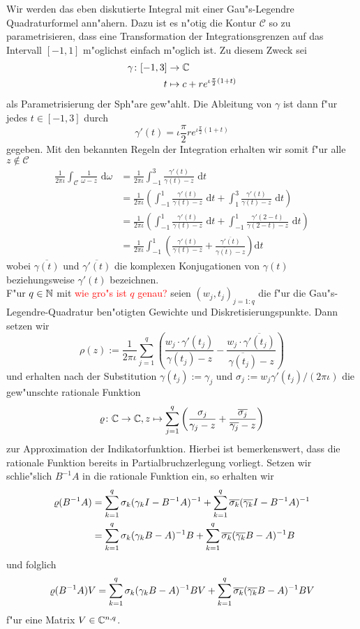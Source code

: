 Wir werden das eben diskutierte Integral mit einer Gau"s-Legendre Quadraturformel ann"ahern.
Dazu ist es n"otig die Kontur $\mathcal{C}$ so zu parametrisieren, dass eine Transformation
der Integrationsgrenzen auf das Intervall $[-1,1]$ m"oglichst einfach m"oglich ist. Zu diesem Zweck sei
\begin{align*}
\gamma\colon[-1,3]&\to\mathbb{C} \\
t&\mapsto c+re^{\iota \frac{\pi}{2}(1+t)}
\end{align*}
als Parametrisierung der Sph"are gew"ahlt. Die
Ableitung von $\gamma$ ist dann f"ur jedes $t\in[-1,3]$ durch
\[
\gamma'(t)=\iota \frac{\pi}{2}re^{\iota \frac{\pi}{2}(1+t)}
\]
gegeben. Mit den bekannten Regeln der Integration erhalten wir somit f"ur alle $z\notin\mathcal{C}$
\begin{align*}
\frac{1}{2\pi\iota}\int_{ \mathcal{C}}\frac{1}{\omega-z}\text{ d}\omega
&= \frac{1}{2\pi\iota} \int_{-1}^3 \frac{\gamma'(t)}{\gamma(t)-z}\text{ d}t \\
&= \frac{1}{2\pi\iota} \left( \int_{-1}^1 \frac{\gamma'(t)}{\gamma(t)-z} \text{ d}t +
\int_{1}^3\frac{\gamma'(t)}{\gamma(t)-z}\text{ d}t \right) \\
&= \frac{1}{2\pi\iota} \left( \int_{-1}^1 \frac{\gamma'(t)}{\gamma(t)-z} \text{ d}t +
\int_{-1}^1\frac{\gamma'(2-t)}{\gamma(2-t)-z}\text{ d}t \right) \\
&= \frac{1}{2\pi\iota} \int_{-1}^1 \left( \frac{\gamma'(t)}{\gamma(t)-z} +
\frac{\overline{\gamma'(t)}}{\overline{\gamma(t)}-z}\right)\text{d}t
\end{align*}
wobei $\overline{\gamma(t)}$ und $\overline{\gamma'(t)}$ die komplexen Konjugationen
von $\gamma(t)$ beziehungsweise $\gamma'(t)$ bezeichnen.\\

F"ur $q\in\mathbb{N}$ mit \textcolor{red}{wie gro"s ist $q$ genau?} seien $(w_j, t_j)_{j=1:q}$
die f"ur die Gau"s-Legendre-Quadratur ben"otigten Gewichte und Diskretisierungspunkte.
Dann setzen wir
\[
\rho(z) := \frac{1}{2\pi\iota}\sum_{j=1}^q \left(
\frac{w_j \cdot \gamma'(t_j)}{\gamma(t_j)-z} - \frac{w_j \cdot \overline{\gamma'(t_j)}}{\overline{\gamma(t_j)}-z}
\right)
\]
und erhalten nach der Substitution $\gamma(t_j) := \gamma_j$ und
$\sigma_j := w_j \gamma'(t_j) / (2\pi\iota)$ die gew"unschte rationale
Funktion
\[
\varrho\colon\mathbb{C}\to\mathbb{C}, z\mapsto\sum_{j=1}^q\left(\frac{\sigma_j}{\gamma_j - z} +
\frac{\overline{\sigma_j}}{\overline{\gamma_j} - z}\right)
\]
zur Approximation der Indikatorfunktion. Hierbei ist bemerkenswert, dass die
rationale Funktion bereits in Partialbruchzerlegung vorliegt. Setzen wir schlie"slich $B^{-1}A$ in die
rationale Funktion ein, so erhalten wir
\begin{align*}
\varrho(B^{-1}A) &= \sum_{k=1}^q \sigma_k (\gamma_k I - B^{-1}A)^{-1} +
\sum_{k=1}^q \overline{\sigma_k} (\overline{\gamma_k} I - B^{-1}A)^{-1}\\
&= \sum_{k=1}^q \sigma_k (\gamma_k B - A)^{-1} B +
\sum_{k=1}^q \overline{\sigma_k} (\overline{\gamma_k} B - A)^{-1} B
\end{align*}
und folglich
\[
\varrho(B^{-1}A)V =
\sum_{k=1}^q \sigma_k (\gamma_k B - A)^{-1} BV +
\sum_{k=1}^q \overline{\sigma_k} (\overline{\gamma_k} B - A)^{-1} BV
\]
f"ur eine Matrix $V\in\mathbb{C}^{n,q}$.

